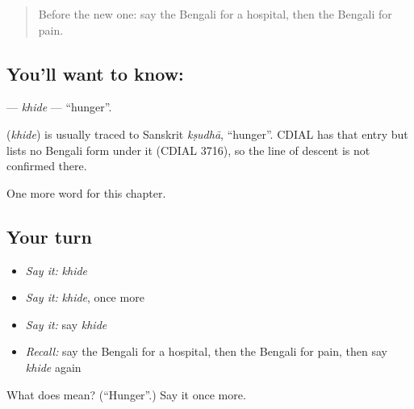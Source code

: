 \begin{quote}
Before the new one: say the Bengali for a hospital, then the Bengali for pain.
\end{quote}

\subsection*{You'll want to know: }
\textbf{} — \emph{khide} — \textquotedblleft{}hunger\textquotedblright{}.

\begin{cousinweb}
\textbf{} (\emph{khide}) is usually traced to Sanskrit \emph{kṣudhā}, \textquotedblleft{}hunger\textquotedblright{}. CDIAL has that entry but lists no Bengali form under it (CDIAL 3716), so the line of descent is not confirmed there.
\end{cousinweb}

\begin{grammarlens}[title={What you've built}]
One more word for this chapter.
\end{grammarlens}

\subsection*{Your turn}
\begin{itemize}
\raggedright
  \item \emph{Say it:} \emph{khide}
  \item \emph{Say it:} \emph{khide}, once more
  \item \emph{Say it:} say \emph{khide}
  \item \emph{Recall:} say the Bengali for a hospital, then the Bengali for pain, then say \emph{khide} again
\end{itemize}

\begin{tcolorbox}[breakable,colback=teal!4,colframe=teal!35!black,title={Before you move on}]
What does  mean? (\textquotedblleft{}Hunger\textquotedblright{}.) Say it once more.
\end{tcolorbox}

